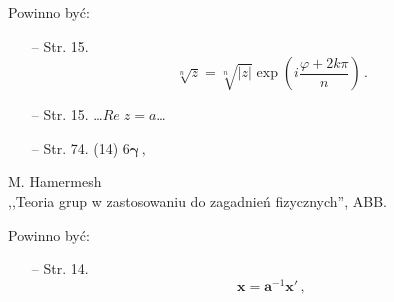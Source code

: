 \documentclass[a4paper,11pt]{article}
\begin{document}
Powinno być:
\begin{itemize}
\item[--] Str. 15.
  $$\sqrt[ n ]{ z } = \sqrt[ n ]{ | z | } \exp( i \frac{ \varphi + 2 k
    \pi }{ n } ) \, .$$
\item[--] Str. 15. \ldots $Re \; z = a$\ldots
\item[--] Str. 74. (14) $6 \boldsymbol{ \gamma } \, ,$
\end{itemize}



\begin{center}
  M. Hamermesh\\
  ,,Teoria grup w zastosowaniu do zagadnień fizycznych'', ABB.
\end{center}


Powinno być:
\begin{itemize}
\item[--] Str. 14.
  $$ \mathbf{ x } = \mathbf{ a }^{ -1 } \mathbf{ x }' \, ,$$
\end{itemize}





 {}



\end{document}
